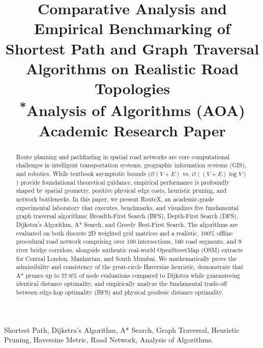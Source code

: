 \documentclass[conference]{IEEEtran}
\begin{document}
\title{Comparative Analysis and Empirical Benchmarking of Shortest Path and Graph Traversal Algorithms on Realistic Road Topologies\\
{\footnotesize \textsuperscript{*}Analysis of Algorithms (AOA) Academic Research Paper}
}

\author{
}

\maketitle

\begin{abstract}
Route planning and pathfinding in spatial road networks are core computational challenges in intelligent transportation systems, geographic information systems (GIS), and robotics. While textbook asymptotic bounds ($\mathcal{O}(V+E)$ vs. $\mathcal{O}((V+E)\log V)$) provide foundational theoretical guidance, empirical performance is profoundly shaped by spatial geometry, positive physical edge costs, heuristic pruning, and network bottlenecks. In this paper, we present RouteX, an academic-grade experimental laboratory that executes, benchmarks, and visualizes five fundamental graph traversal algorithms: Breadth-First Search (BFS), Depth-First Search (DFS), Dijkstra's Algorithm, A* Search, and Greedy Best-First Search. The algorithms are evaluated on both discrete 2D weighted grid matrices and a realistic, 100\% offline procedural road network comprising over 100 intersections, 160 road segments, and 9 river bridge corridors, alongside authentic real-world OpenStreetMap (OSM) extracts for Central London, Manhattan, and South Mumbai. We mathematically prove the admissibility and consistency of the great-circle Haversine heuristic, demonstrate that A* prunes up to 57.6\% of node evaluations compared to Dijkstra while guaranteeing identical distance optimality, and empirically analyze the fundamental trade-off between edge-hop optimality (BFS) and physical geodesic distance optimality.
\end{abstract}

\begin{IEEEkeywords}
Shortest Path, Dijkstra's Algorithm, A* Search, Graph Traversal, Heuristic Pruning, Haversine Metric, Road Network, Analysis of Algorithms.
\end{IEEEkeywords}
\end{document}
